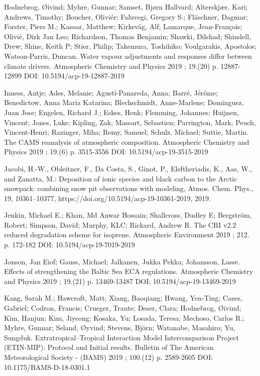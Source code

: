 \begin{list}{}{\setlength{\leftmargin}{15pt}\setlength{\itemindent}{-\leftmargin}}
\item[]
Hodnebrog, Øivind; Myhre, Gunnar; Samset, Bjørn Hallvard; Alterskjær, Kari; Andrews, Timothy; Boucher, Oliviér; Faluvegi, Gregory S.; Fläschner, Dagmar; Forster, Piers M.; Kasoar, Matthew; Kirkevåg, Alf; Lamarque, Jean-François; Oliviè, Dirk Jan Leo; Richardson, Thomas Benjamin; Shawki, Dilshad; Shindell, Drew; Shine, Keith P; Stier, Philip; Takemura, Toshihiko; Voulgarakis, Apostolos; Watson-Parris, Duncan.
Water vapour adjustments and responses differ between climate drivers.
Atmospheric Chemistry and Physics 2019 ; 19.(20) p. 12887-12899
DOI: 10.5194/acp-19-12887-2019

\item[]
Inness, Antje; Ades, Melanie; Agustí-Panareda, Anna; Barré, Jérôme; Benedictow, Anna Maria Katarina; Blechschmidt, Anne-Marlene; Dominguez, Juan Jose; Engelen, Richard J.; Eskes, Henk; Flemming, Johannes; Huijnen, Vincent; Jones, Luke; Kipling, Zak; Massart, Sebastien; Parrington, Mark; Peuch, Vincent-Henri; Razinger, Miha; Remy, Samuel; Schulz, Michael; Suttie, Martin.
The CAMS reanalysis of atmospheric composition.
Atmospheric Chemistry and Physics 2019 ; 19.(6) p. 3515-3556
DOI: 10.5194/acp-19-3515-2019

\item[]
Jacobi, H.-W., Obleitner, F., Da Costa, S., Ginot, P., Eleftheriadis, K., Aas, W., and Zanatta, M.: Deposition of ionic species and black carbon to the Arctic snowpack: combining snow pit observations with modeling, 
Atmos. Chem. Phys., 19, 10361–10377, 
https://doi.org/10.5194/acp-19-10361-2019, 2019.

\item[]
Jenkin, Michael E.; Khan, Md Anwar Hossain; Shallcross, Dudley E; Bergström, Robert; Simpson, David; Murphy, KLC; Rickard, Andrew R.
The CRI v2.2 reduced degradation scheme for isoprene.
Atmospheric Environment 2019 ; 212. p. 172-182
DOI: 10.5194/acp-19-7019-2019

\item[]
Jonson, Jan Eiof; Gauss, Michael; Jalkanen, Jukka Pekka; Johansson, Lasse.
Effects of strengthening the Baltic Sea ECA regulations.
Atmospheric Chemistry and Physics 2019 ; 19.(21) p. 13469-13487
DOI: 10.5194/acp-19-13469-2019

\item[]
Kang, Sarah M.; Hawcroft, Matt; Xiang, Baoqiang; Hwang, Yen-Ting; Cazes, Gabriel; Codron, Francis; Crueger, Traute; Deser, Clara; Hodnebrog, Øivind; Kim, Hanjun; Kim, Jiyeong; Kosaka, Yu; Losada, Teresa; Mechoso, Carlos R.; Myhre, Gunnar; Seland, Øyvind; Stevens, Björn; Watanabe, Masahiro; Yu, Sungduk.
Extratropical–Tropical Interaction Model Intercomparison Project (ETIN-MIP): Protocol and Initial results.
Bulletin of The American Meteorological Society - (BAMS) 2019 ; 100.(12) p. 2589-2605
DOI: 10.1175/BAMS-D-18-0301.1


\end{list}
